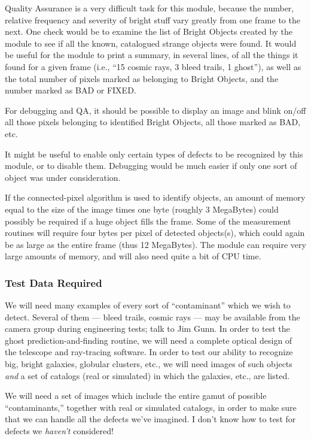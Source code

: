   Quality Assurance is a very difficult task for this
module, because the number, relative frequency and
severity of bright stuff vary greatly from one
frame to the next.  One check would be to examine the
list of Bright Objects created by the module to see
if all the known, catalogued strange objects were
found.  It would be useful for the module to print 
a summary, in several lines, of all the things it
found for a given frame (i.e., ``15 cosmic rays,
3 bleed trails, 1 ghost''), as well as the total
number of pixels marked as belonging to Bright
Objects, and the number marked as BAD or FIXED.

  For debugging and QA, it should be possible to
display an image and blink on/off all those pixels
belonging to identified Bright Objects, all those
marked as BAD, etc.  

  It might be useful to enable only certain types
of defects to be recognized by this module, or to
disable them.  Debugging would be much easier if
only one sort of object was under consideration.

  If the connected-pixel algorithm is used to 
identify objects, an amount of memory equal to the
size of the image times one byte (roughly 3 MegaBytes)
could possibly be required if a huge object fills the
frame.  Some of the measurement routines will require
four bytes per pixel of detected objects(s), which
could again be as large as the entire frame (thus
12 MegaBytes).  The \bom module can require very
large amounts of memory, and will also need quite
a bit of CPU time.  

\subsubsection {Test Data Required}

  We will need many examples of every sort of ``contaminant''
which we wish to detect.  Several of them --- bleed trails,
cosmic rays --- may be available from the camera group
during engineering tests; talk to Jim Gunn.  
In order to test the ghost prediction-and-finding routine,
we will need a complete optical design of the telescope and
ray-tracing software.  In order to test our ability to
recognize big, bright galaxies, globular clusters, etc.,
we will need images of such objects {\it and} 
a set of catalogs (real or simulated) in which the
galaxies, etc., are listed.

  We will need a set of images which include the entire
gamut of possible ``contaminants,'' together with 
real or simulated catalogs, in order to make sure that
we can handle all the defects we've imagined.  
I don't know how to test for defects we {\it haven't}
considered!

